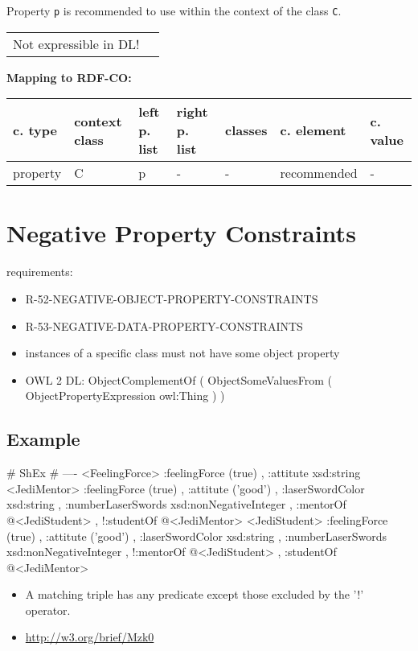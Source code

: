 \documentclass{llncs}
\newcommand{\ms}[1]{\texttt{#1}}
\newenvironment{gcotable}{
  \scriptsize
  \sffamily
  \vspace{0cm}
	\begin{center}
	\textbf{\vspace{0.4cm}Mapping to RDF-CO:} \\
  \begin{tabular}{l|l|l|l|l|l|l}
	\hline
  \textbf{c. type} & \textbf{context class} & \textbf{left p. list} & \textbf{right p. list} & \textbf{classes} & \textbf{c. element} & \textbf{c. value} \\
  \hline

}{
  \hline
  \end{tabular}
	\end{center}
}
\newenvironment{DL}{
  \vspace{0cm}
	\begin{center}
  \begin{tabular}{r l}

}{
  \end{tabular}
	\end{center}
}
\begin{document}
Property \ms{p} is recommended to use within the context of the class \ms{C}.

\begin{DL}
Not expressible in DL!
\end{DL}

\begin{gcotable}
property & C & p & - & - & recommended & - \\
\end{gcotable}

\section{Negative Property Constraints}

requirements:

\begin{itemize}
	\item R-52-NEGATIVE-OBJECT-PROPERTY-CONSTRAINTS
	\item R-53-NEGATIVE-DATA-PROPERTY-CONSTRAINTS
\end{itemize}

\begin{itemize}
	\item instances of a specific class must not have some object property
  \item OWL 2 DL: ObjectComplementOf ( ObjectSomeValuesFrom ( ObjectPropertyExpression owl:Thing ) )
\end{itemize}

\subsection{Example}

\begin{ex}
# ShEx
# ----
<FeelingForce> {
    :feelingForce (true) ,
    :attitute xsd:string }
<JediMentor> {
    :feelingForce (true) ,
    :attitute ('good') ,
    :laserSwordColor xsd:string ,
    :numberLaserSwords xsd:nonNegativeInteger ,
    :mentorOf @<JediStudent> ,
   !:studentOf @<JediMentor> }
<JediStudent> {
    :feelingForce (true) ,
    :attitute ('good') ,
    :laserSwordColor xsd:string ,
    :numberLaserSwords xsd:nonNegativeInteger ,
   !:mentorOf @<JediStudent> ,
    :studentOf @<JediMentor> }
\end{ex}

\begin{itemize}
	\item A matching triple has any predicate except those excluded by the '!' operator.
  \item \url{http://w3.org/brief/Mzk0}
\end{itemize}
\end{document}
